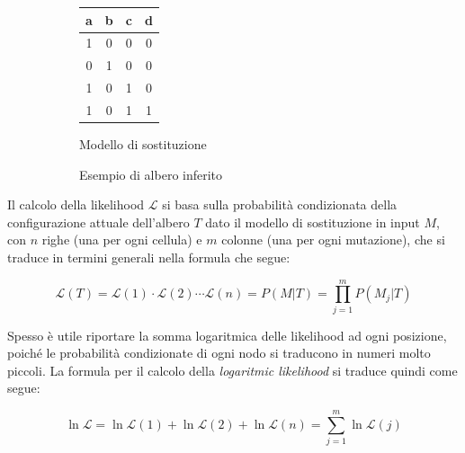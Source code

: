 \begin{figure}[!h]
    \begin{subfigure}[b]{0.5 \textwidth}
        \centering
        \begin{tabular}{*{4}{c}}
            a & b & c & d \\ \midrule \midrule
            1 & 0 & 0 & 0 \\
            0 & 1 & 0 & 0 \\
            1 & 0 & 1 & 0 \\
            1 & 0 & 1 & 1
        \end{tabular}
        \caption{Modello di sostituzione}
        \label{fig:intro-extra-lh-tree-matrix}
    \end{subfigure}
    \begin{subfigure}[b]{0.5 \textwidth}
        \centering
        \caption{Esempio di albero inferito}
        \label{fig:intro-extra-lh-tree-model}
    \end{subfigure}
    \caption{}
    \label{fig:intro-extra-lh-tree}
\end{figure}

Il calcolo della likelihood $\mathcal{L}$ si basa sulla probabilità condizionata della configurazione attuale dell'albero $T$ dato il modello di sostituzione in input $M$, con $n$ righe (una per ogni cellula) e $m$ colonne (una per ogni mutazione), che si traduce in termini generali nella formula che segue:

\begin{equation}
    \mathcal{L}(T) = \mathcal{L}(1) \cdot \mathcal{L}(2) \cdots \mathcal{L}(n) = P(M | T) = \prod_{j = 1}^{m} P(M_j | T)
    \label{eq:intro-extra-lh-formula}
\end{equation}

Spesso è utile riportare la somma logaritmica delle likelihood ad ogni posizione, poiché le probabilità condizionate di ogni nodo si traducono in numeri molto piccoli. La formula per il calcolo della \textit{logaritmic likelihood} si traduce quindi come segue:

\begin{equation}
    \ln \mathcal{L} = \ln \mathcal{L}(1) + \ln \mathcal{L}(2) + \ln \mathcal{L}(n) = \sum_{j = 1}^m \ln \mathcal{L}(j)
    \label{eq:intro-extra-lh-log}
\end{equation}